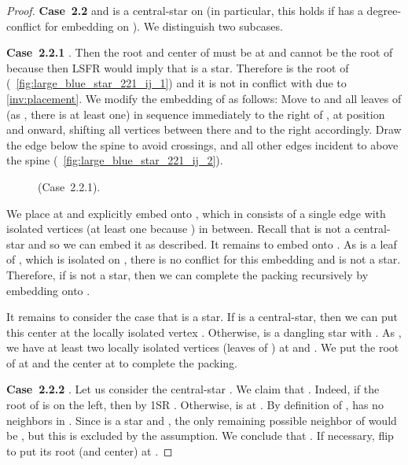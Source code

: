 \documentclass[11pt,a4paper,colorlinks=true,urlcolor=blue,citecolor=red]{article}
\theoremstyle{plain}
\newcommand{\case}[1]{\par\vspace{.5\baselineskip}\noindent\textbf{\sffamily Case~#1}}
\begin{document}
\begin{proof}
  \case{2.2}  and  is a central-star
   on  (in particular, this holds if
   has a degree-conflict for embedding on ). We
  distinguish two subcases.

  \case{2.2.1} . Then the root and center  of
   must be at  and cannot be the root of  because then
  LSFR would imply that  is a star. Therefore  is the root of 
  (\figurename~\ref{fig:large_blue_star_221_ij_1}) and it is not in
  conflict with  due to \ref{inv:placement}. We modify the embedding
  of  as follows: Move  to  and all leaves of  (as
  , there is at least one) in sequence
  immediately to the right of , at position  and onward,
  shifting all vertices between there and  to the right accordingly.
  Draw the edge  below the spine to avoid crossings, and all
  other edges incident to  above the spine
  (\figurename~\ref{fig:large_blue_star_221_ij_2}).
\begin{figure}[htbp]
    \centering\hfil {}\hfil
    \hfil
    \caption{
      (Case~2.2.1).\label{fig:large_blue_star_221_ij}}
  \end{figure}


  We place  at  and explicitly embed  onto , which
  in  consists of a single edge  with isolated vertices
  (at least one because ) in between. Recall that  is
  not a central-star and so we can embed it as described. It remains to
  embed  onto . As  is a leaf of ,
  which is isolated on , there is no conflict for this
  embedding and  is not a star. Therefore, if  is not a
  star, then we can complete the packing recursively by embedding 
  onto .

  It remains to consider the case that  is a star. If  is a
  central-star, then we can put this center at the locally isolated
  vertex . Otherwise,  is a dangling star with .
  As , we have at least two locally
  isolated vertices (leaves of ) at  and . We
  put the root of  at  and the center at  to
  complete the packing.

  \case{2.2.2} . Let us consider the
  central-star . We claim that
  . Indeed, if the root  of  is on
  the left, then by 1SR . Otherwise,  is at
  . By definition of ,  has no neighbors in
  . Since  is a star and
  , the only remaining possible neighbor of  would
  be , but this is excluded by the assumption. We conclude that
  . If necessary, flip  to put its root (and
  center) at .


\end{proof}
\end{document}
